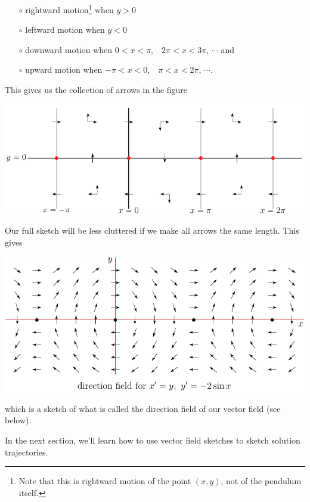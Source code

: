 \begin{eg}
\begin{itemize}
\item[$\circ$]
rightward motion\footnote{Note that this is rightward motion of the point $(x,y)$, not of the pendulum itself.} when $y>0$
\item[$\circ$]
leftward motion when $y<0$
\item[$\circ$]
downward motion when $0<x<\pi$,\ \  $2\pi<x<3\pi$, $\cdots$ and 
\item[$\circ$]
upward motion when $-\pi<x<0$,\ \  $\pi<x<2\pi$, $\cdots$. 
\end{itemize}
This gives us the collection of arrows in the figure
\begin{wfig}
\begin{center}
    \includegraphics{phasePendulum1.pdf}
\end{center}
\end{wfig}
Our full sketch will be less cluttered if we make all arrows the
same length. This gives
\begin{wfig}
\begin{center}
    \null\hskip0.3in\includegraphics{pendulumField2.pdf}
\end{center}
\end{wfig}
which is a sketch of what is called the direction field of our vector field
(see below). 

In the next section, we'll learn how to use vector field sketches to sketch solution trajectories.
\end{eg}

